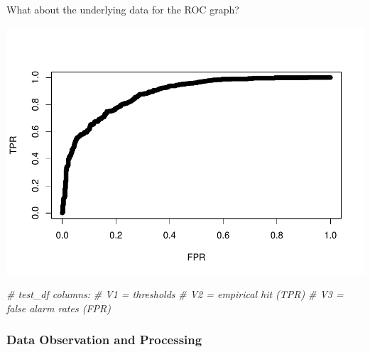 \documentclass[
]{article}
\newenvironment{Shaded}{\begin{snugshade}}{\end{snugshade}}
\newcommand{\AttributeTok}[1]{\textcolor[rgb]{0.77,0.63,0.00}{#1}}
\newcommand{\CommentTok}[1]{\textcolor[rgb]{0.56,0.35,0.01}{\textit{#1}}}
\newcommand{\FunctionTok}[1]{\textcolor[rgb]{0.00,0.00,0.00}{#1}}
\newcommand{\NormalTok}[1]{#1}
\newcommand{\OtherTok}[1]{\textcolor[rgb]{0.56,0.35,0.01}{#1}}
\newcommand{\SpecialCharTok}[1]{\textcolor[rgb]{0.00,0.00,0.00}{#1}}
\newcommand{\StringTok}[1]{\textcolor[rgb]{0.31,0.60,0.02}{#1}}
\begin{document}
What about the underlying data for the ROC graph?

\begin{Shaded}
\end{Shaded}

\includegraphics{PTT_Analysis_of_Test_Scores_Unfinished_files/figure-latex/auc-demo-roc-data-1.pdf}

\begin{Shaded}
\begin{Highlighting}[]
\CommentTok{\# test\_df columns:}
\CommentTok{\# V1 = thresholds}
\CommentTok{\# V2 = empirical hit (TPR)}
\CommentTok{\# V3 = false alarm rates (FPR)}
\end{Highlighting}
\end{Shaded}

\hypertarget{roc-prep}{%
\subsubsection{Data Observation and Processing}\label{roc-prep}}
\end{document}
